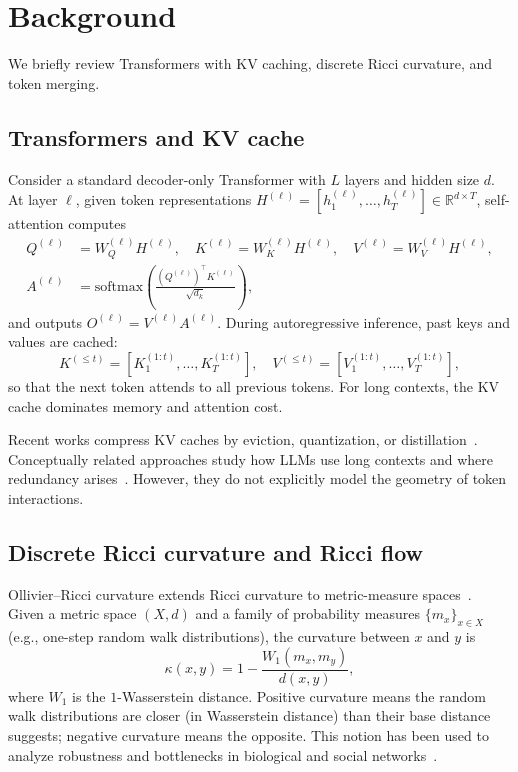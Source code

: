 \documentclass{article}
\theoremstyle{plain}
\theoremstyle{definition}
\theoremstyle{remark}
\newcommand{\RR}{\mathbb{R}}
\begin{document}
\section{Background}
\label{sec:background}

We briefly review Transformers with KV caching, discrete Ricci curvature, and token merging.

\subsection{Transformers and KV cache}

Consider a standard decoder-only Transformer with $L$ layers and hidden size $d$. At layer $\ell$, given token representations $H^{(\ell)} = [h^{(\ell)}_1,\dots,h^{(\ell)}_T] \in \RR^{d \times T}$, self-attention computes
\begin{align}
  Q^{(\ell)} &= W_Q^{(\ell)} H^{(\ell)}, \quad
  K^{(\ell)} = W_K^{(\ell)} H^{(\ell)}, \quad
  V^{(\ell)} = W_V^{(\ell)} H^{(\ell)}, \\
  A^{(\ell)} &= \mathrm{softmax}\!\left(\frac{(Q^{(\ell)})^\top K^{(\ell)}}{\sqrt{d_k}}\right),
\end{align}
and outputs $O^{(\ell)} = V^{(\ell)} A^{(\ell)}$. During autoregressive inference, past keys and values are cached:
\begin{equation}
  K^{(\leq t)} = [K^{(1:t)}_1,\dots,K^{(1:t)}_T], \quad
  V^{(\leq t)} = [V^{(1:t)}_1,\dots,V^{(1:t)}_T],
\end{equation}
so that the next token attends to all previous tokens. For long contexts, the KV cache dominates memory and attention cost.

Recent works compress KV caches by eviction, quantization, or distillation~\citep{ge2024fastgen,liu2024minicache,li2024snapkv,hooper2024kvquant,devoto2024l2kv}. Conceptually related approaches study how LLMs use long contexts and where redundancy arises~\citep{liu2024lost}. However, they do not explicitly model the geometry of token interactions.

\subsection{Discrete Ricci curvature and Ricci flow}

Ollivier--Ricci curvature extends Ricci curvature to metric-measure spaces~\citep{ollivier2009ricci}. Given a metric space $(X,d)$ and a family of probability measures $\{m_x\}_{x\in X}$ (e.g., one-step random walk distributions), the curvature between $x$ and $y$ is
\begin{equation}
  \kappa(x,y) = 1 - \frac{W_1(m_x, m_y)}{d(x,y)},
\end{equation}
where $W_1$ is the $1$-Wasserstein distance. Positive curvature means the random walk distributions are closer (in Wasserstein distance) than their base distance suggests; negative curvature means the opposite. This notion has been used to analyze robustness and bottlenecks in biological and social networks~\citep{sandhu2015graph,ni2019community,sia2019ollivier}.
\end{document}
